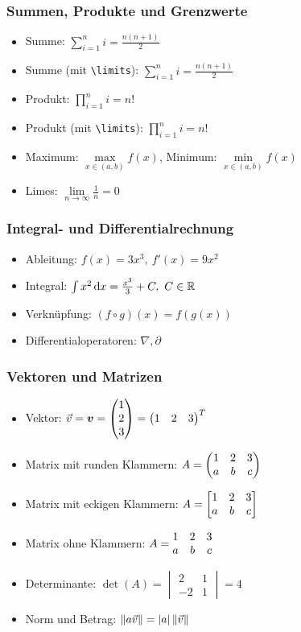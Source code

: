 \documentclass[fontsize=10pt]{scrartcl}
\begin{document}
\begin{cheatsheet}
\subsubsection{Summen, Produkte und Grenzwerte}
\begin{itemize}
    \item Summe: $\sum_{i=1}^n i = \frac{n(n+1)}{2}$
    \item Summe (mit \texttt{\textbackslash limits}): $\sum\limits_{i=1}^n i = \frac{n(n+1)}{2}$
    \item Produkt: $\prod_{i=1}^n i = n!$
    \item Produkt (mit \texttt{\textbackslash limits}): $\prod\limits_{i=1}^n i = n!$
    \item Maximum: $\max\limits_{x \in (a,b)} f(x)$, Minimum: $\min\limits_{x \in (a,b)} f(x)$
    \item Limes: $\lim\limits_{n \to \infty} \frac{1}{n} = 0$
\end{itemize}

\subsubsection{Integral- und Differentialrechnung}
\begin{itemize}
    \item Ableitung: $f(x) = 3x^3,\ f'(x) = 9x^2$
    \item Integral: $\int x^2 \mathop{}\!\mathrm{d} x = \frac{x^3}{3} + C,\ C \in \mathbb{R}$
    \item Verknüpfung: $(f \circ g)(x) = f(g(x))$
    \item Differentialoperatoren: $\nabla, \partial$
\end{itemize}

\subsubsection{Vektoren und Matrizen}
\begin{itemize}
    \item Vektor: $\vec{v} = \boldsymbol{v} = \begin{pmatrix} 1 \\ 2 \\ 3 \end{pmatrix} = \begin{pmatrix} 1 & 2 & 3 \end{pmatrix}^T$
    \item Matrix mit runden Klammern: $A = \begin{pmatrix} 1 & 2 & 3 \\ a & b & c \end{pmatrix}$
    \item Matrix mit eckigen Klammern: $A = \begin{bmatrix} 1 & 2 & 3 \\ a & b & c \end{bmatrix}$
    \item Matrix ohne Klammern: $A = \begin{matrix} 1 & 2 & 3 \\ a & b & c \end{matrix}$
    \item Determinante: $\det(A) = \begin{vmatrix} 2 & 1 \\ -2 & 1 \end{vmatrix} = 4$
    \item Norm und Betrag: $\lVert a \vec{v}\rVert = \lvert a\rvert \, \lVert\vec{v}\rVert$
\end{itemize}


\end{cheatsheet}
\end{document}
